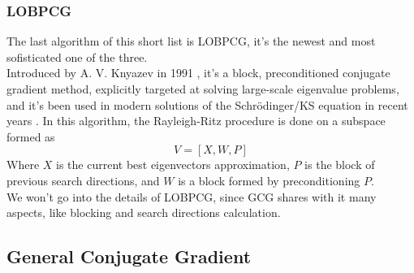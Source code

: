 \subsubsection{LOBPCG}
The last algorithm of this short list is LOBPCG, it's the newest and most sofisticated one of the three.
\\Introduced by A. V. Knyazev in 1991 \cite{LOBPCG}, it's a block, preconditioned conjugate gradient method, explicitly targeted at solving large-scale eigenvalue problems, and it's been used in modern solutions of the Schr\"odinger/KS equation in recent years \cite{LOBPCGDKS,Nottoli2023,LIN2013205,li2020efficient}.
In this algorithm, the Rayleigh-Ritz procedure is done on a subspace formed as
\begin{equation}
    \label{eq:LOBPCG_search_subspace}
    V = [X, W, P]
\end{equation}
Where $X$ is the current best eigenvectors approximation, $P$ is the block of previous search directions, and $W$ is a block formed by preconditioning $P$.
\\We won't go into the details of LOBPCG, since GCG shares with it many aspects, like blocking and search directions calculation.
\subsection{General Conjugate Gradient}